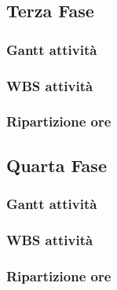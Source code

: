 \subsection{Terza Fase}
\subsubsection{Gantt attività}

\subsubsection{WBS attività}

\subsubsection{Ripartizione ore}

\subsection{Quarta Fase}
\subsubsection{Gantt attività}

\subsubsection{WBS attività}

\subsubsection{Ripartizione ore}

